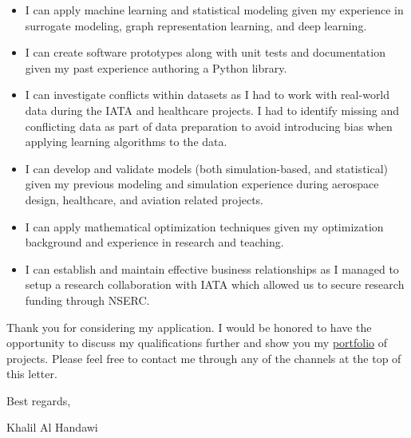 \documentclass[12pt]{article} %
\begin{document}
\begin{itemize}
	\item I can apply machine learning and statistical modeling given my experience in surrogate modeling, graph representation learning, and deep learning.
	\item I can create software prototypes along with unit tests and documentation given my past experience authoring a Python library.
	\item I can investigate conflicts within datasets as I had to work with real-world data during the IATA and healthcare projects. I had to identify missing and conflicting data as part of data preparation to avoid introducing bias when applying learning algorithms to the data.
	\item I can develop and validate models (both simulation-based, and statistical) given my previous modeling and simulation experience during aerospace design, healthcare, and aviation related projects.
	\item I can apply mathematical optimization techniques given my optimization background and experience in research and teaching.
	\item I can establish and maintain effective business relationships as I managed to setup a research collaboration with IATA which allowed us to secure research funding through NSERC.
\end{itemize}

\medskip %

Thank you for considering my application. I would be honored to have the opportunity to discuss my qualifications further and show you my \href{https://khbalhandawi.github.io/projects/}{portfolio} of projects. Please feel free to contact me through any of the channels at the top of this letter.

\medskip %

Best regards,

\medskip %


Khalil Al Handawi


\medskip %

\end{document}
